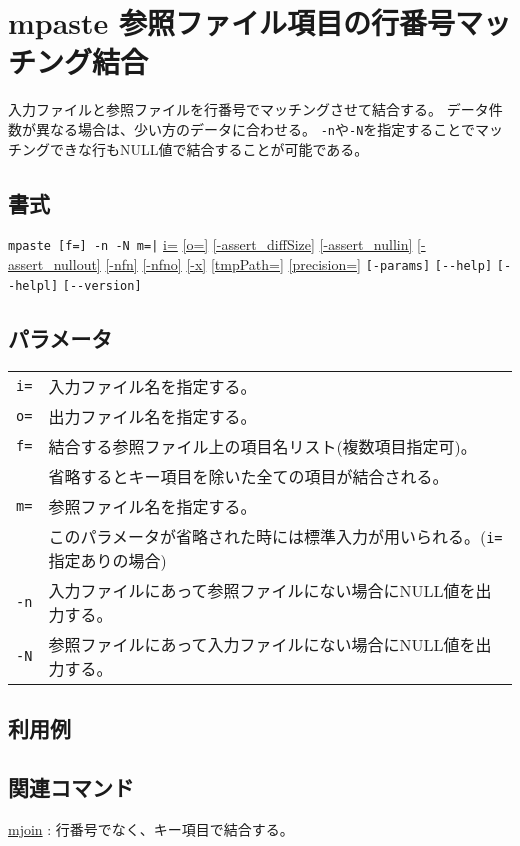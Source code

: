 
%

\section{mpaste 参照ファイル項目の行番号マッチング結合\label{sect:mpaste}}
入力ファイルと参照ファイルを行番号でマッチングさせて結合する。
データ件数が異なる場合は、少い方のデータに合わせる。
\verb|-n|や\verb|-N|を指定することでマッチングできな行もNULL値で結合することが可能である。

\subsection*{書式}
\verb/mpaste [f=] -n -N m=|/   
\hyperref[sect:option_i]{i=}
\hyperref[sect:option_o]{[o=]}
\hyperref[sect:option_assert_diffSize]{[-assert\_diffSize]}
\hyperref[sect:option_assert_nullin]{[-assert\_nullin]}
\hyperref[sect:option_assert_nullout]{[-assert\_nullout]}
\hyperref[sect:option_nfn]{[-nfn]} 
\hyperref[sect:option_nfno]{[-nfno]}  
\hyperref[sect:option_x]{[-x]}
\hyperref[sect:option_option_tmppath]{[tmpPath=]}
\hyperref[sect:option_precision]{[precision=]}
\verb|[-params]|
\verb|[--help]|
\verb|[--helpl]|
\verb|[--version]|\\

\subsection*{パラメータ}
\begin{table}[htbp]
{\small
\begin{tabular}{ll}
\verb|i=|    & 入力ファイル名を指定する。\\
\verb|o=|    & 出力ファイル名を指定する。\\
\verb|f=|    & 結合する参照ファイル上の項目名リスト(複数項目指定可)。\\
             & 省略するとキー項目を除いた全ての項目が結合される。\\
\verb|m=|    & 参照ファイル名を指定する。\\
             & このパラメータが省略された時には標準入力が用いられる。(\verb|i=|指定ありの場合)\\
\verb|-n|    & 入力ファイルにあって参照ファイルにない場合にNULL値を出力する。\\
\verb|-N|    & 参照ファイルにあって入力ファイルにない場合にNULL値を出力する。\\
\end{tabular} 
}
\end{table} 

\subsection*{利用例}


\subsection*{関連コマンド}
\hyperref[sect:mjoin]{mjoin} : 行番号でなく、キー項目で結合する。

%
